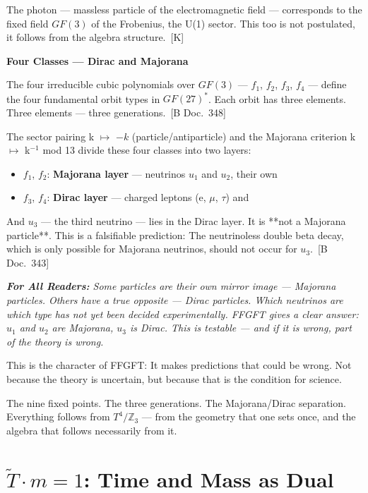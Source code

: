 \documentclass[11pt,oneside]{book}
\newcommand{\status}[1]{\penalty10000\,{\scriptsize\textcolor{gray!60}{[#1]}}}
\newenvironment{laierspur}{%
  \par\vspace{4pt}%
  \noindent\small\itshape\color{blue!60!black}%
  \textbf{For All Readers:}\enspace\ignorespaces}{%
  \par\vspace{4pt}\normalsize\normalfont\normalcolor}
\begin{document}
The photon — massless particle of the electromagnetic field — corresponds to
the fixed field $GF(3)$ of the Frobenius, the U(1) sector. This too is not
postulated, it follows from the algebra structure. \status{K}

\textbf{Four Classes — Dirac and Majorana}

The four irreducible cubic polynomials over $GF(3)$ — $f_1$, $f_2$, $f_3$, $f_4$ —
define the four fundamental orbit types in $GF(27)^*$. Each orbit has three
elements. Three elements — three generations. \status{B Doc.~348}

The sector pairing k $\mapsto$ $-k$ (particle/antiparticle) and the Majorana criterion
k $\mapsto$ k$^{-1}$ mod 13 divide these four classes into two layers:

\begin{itemize}
  \item $f_1$, $f_2$: \textbf{Majorana layer} — neutrinos $
u_1$ and $
u_2$, their own
\end{itemize}

\begin{itemize}
  \item $f_3$, $f_4$: \textbf{Dirac layer} — charged leptons (e, $\mu$, $\tau$) and
\end{itemize}

And $
u_3$ — the third neutrino — lies in the Dirac layer. It is **not a
Majorana particle**. This is a falsifiable prediction: The neutrinoless
double beta decay, which is only possible for Majorana neutrinos, should not
occur for $
u_3$. \status{B Doc.~343}

\begin{laierspur}
Some particles are their own mirror image — Majorana particles. Others
have a true opposite — Dirac particles. Which neutrinos are which type has
not yet been decided experimentally. FFGFT gives a clear answer: $
u_1$ and
$
u_2$ are Majorana, $
u_3$ is Dirac. This is testable — and if it is wrong, part
of the theory is wrong.
\end{laierspur}

This is the character of FFGFT: It makes predictions that could be wrong.
Not because the theory is uncertain, but because that is the condition for
science.

The nine fixed points. The three generations. The Majorana/Dirac separation.
Everything follows from $T^4/\mathbb{Z}_3$ — from the geometry that one sets once,
and the algebra that follows necessarily from it.


\chapter{\texorpdfstring{$\tilde{T}\cdot m = 1$: Time and Mass as Dual}{T$\cdot$m = 1: Time and Mass as Dual}}
\end{document}
